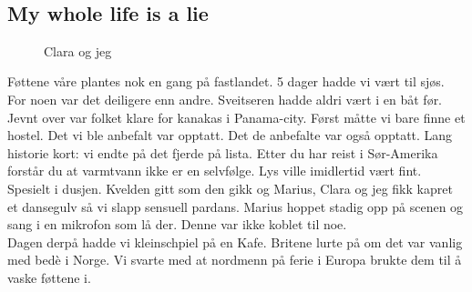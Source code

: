 

\\
\subsection{My whole life is a lie}

\begin{figure}[H]
	\centering
	\noindent{}
	\caption*{Clara og jeg}
	\label{fig:claraogaksel}
\end{figure}

Føttene våre plantes nok en gang på fastlandet. 5 dager hadde vi vært
til sjøs.  For
noen var det deiligere enn andre. Sveitseren hadde aldri vært i en båt
før. Jevnt over var folket klare for kanakas i Panama-city.
Først måtte vi bare finne et hostel. Det vi ble anbefalt var opptatt.
Det de anbefalte var også opptatt. Lang historie kort: vi endte på det
fjerde på lista. Etter du har reist i Sør-Amerika forstår du at
varmtvann ikke er en selvfølge. Lys ville imidlertid vært fint.
Spesielt i dusjen.
Kvelden gitt som den gikk og Marius, Clara og jeg fikk kapret et
dansegulv så vi slapp sensuell pardans. Marius hoppet stadig opp på
scenen og sang i en mikrofon som lå der. Denne var ikke koblet til
noe. \\
Dagen derpå hadde vi kleinschpiel på en Kafe. Britene lurte på om
det var vanlig med bedè i Norge. Vi svarte med at nordmenn på ferie i
Europa brukte dem til å vaske føttene i.\\

